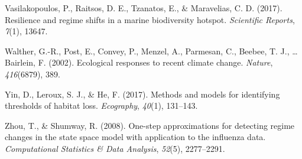 \documentclass[12pt,twoside,openany]{reedthesis}
\begin{document}
\leavevmode\hypertarget{ref-vasilakopoulos2017resilience}{}%
Vasilakopoulos, P., Raitsos, D. E., Tzanatos, E., \& Maravelias, C. D. (2017). Resilience and regime shifts in a marine biodiversity hotspot. \emph{Scientific Reports}, \emph{7}(1), 13647.

\leavevmode\hypertarget{ref-walther_ecological_2002}{}%
Walther, G.-R., Post, E., Convey, P., Menzel, A., Parmesan, C., Beebee, T. J., \ldots{} Bairlein, F. (2002). Ecological responses to recent climate change. \emph{Nature}, \emph{416}(6879), 389.

\leavevmode\hypertarget{ref-yin2017methods}{}%
Yin, D., Leroux, S. J., \& He, F. (2017). Methods and models for identifying thresholds of habitat loss. \emph{Ecography}, \emph{40}(1), 131--143.

\leavevmode\hypertarget{ref-zhou2008one}{}%
Zhou, T., \& Shumway, R. (2008). One-step approximations for detecting regime changes in the state space model with application to the influenza data. \emph{Computational Statistics \& Data Analysis}, \emph{52}(5), 2277--2291.
\end{document}
